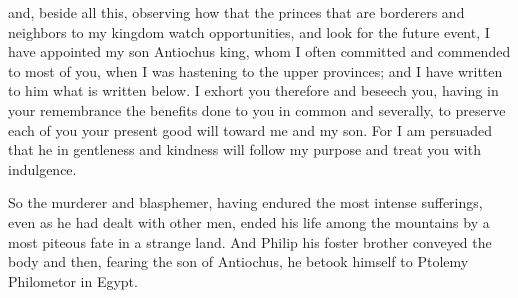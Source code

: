 {and, beside all this, observing how that the princes that are borderers and neighbors to my kingdom watch opportunities, and look for the future event, I have appointed my son Antiochus
{} king, whom I often committed and commended to most of you, when I was hastening to the upper provinces; and I have written to him what is written below.
I exhort you therefore and beseech you, having in your remembrance the benefits done to you in common and severally, to preserve each of you your present good will toward me and my son.
For I am persuaded that he in gentleness and kindness will follow my purpose and treat you with indulgence.
\par }{\PP {}So the murderer and blasphemer, having endured the most intense sufferings, even as he had dealt with other men, ended his life among the mountains by a most piteous fate in a strange land.
And Philip his foster brother conveyed the body
{} and then, fearing the son of Antiochus, he betook himself to Ptolemy Philometor in Egypt.

}
